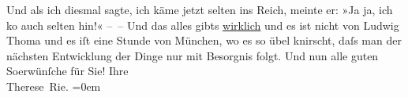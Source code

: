 \begin{ledgroupsized}[t]{13cm}
           \pstart
           Und als ich diesmal sagte, ich käme jetzt selten ins Reich, meinte er: »Ja ja, ich ko{\geminationm} auch selten
               hin!« – – Und das alles gibts \uline{wirklich} und es ist
               nicht von Ludwig Thoma und es iſt eine Stunde
               von München, wo {\pb}es so
               übel knirscht, daſs man der nächsten Entwicklung der Dinge nur mit Besorgnis
               folgt.\pend
           \pstart
           Und nun alle guten So{\geminationm}erwünſche für Sie!\pend
           \pstart
           Ihre{\\[\baselineskip]}\spacefill\mbox{Therese Rie.}\pend
           \leftskip=0em{}
         
         \endnumbering{}\end{ledgroupsized}  \newcommand{\dateiname}{L02573}\newcommand{\titel}{Therese Rie-Andro an Arthur Schnitzler, [Anfang Juli 1923]}\newcommand{\editorInnen}{Martin Anton Müller und Gerd-Hermann Susen}
      